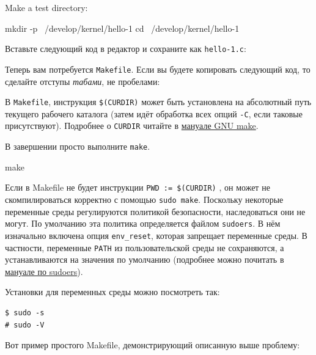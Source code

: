 \documentclass[10pt, oneside]{book}
\begin{document}
Make a test directory:
\begin{codebash}
mkdir -p ~/develop/kernel/hello-1
cd ~/develop/kernel/hello-1
\end{codebash}

Вставьте следующий код в редактор и сохраните как \verb|hello-1.c|:


Теперь вам потребуется \verb|Makefile|. Если вы будете копировать следующий код, то сделайте отступы \textit{табами}, не пробелами:


В \verb|Makefile|, инструкция \verb|$(CURDIR)| может быть установлена на абсолютный путь текущего рабочего каталога (затем идёт обработка всех опций \verb|-C|, если таковые присутствуют).
Подробнее о \verb|CURDIR| читайте в \href{https://www.gnu.org/software/make/manual/make.html}{мануале GNU make}.

В завершении просто выполните \verb|make|.

\begin{codebash}
make
\end{codebash}

Если в Makefile не будет инструкции \verb|PWD := $(CURDIR)| , он может не скомпилироваться корректно с помощью \verb|sudo make|.
Поскольку некоторые переменные среды регулируются политикой безопасности, наследоваться они не могут. По умолчанию эта политика
определяется файлом \verb|sudoers|.
В нём изначально включена опция \verb|env_reset|, которая запрещает переменные среды. В частности, переменные \verb|PATH| из пользовательской среды не сохраняются, а устанавливаются на значения по умолчанию (подробнее можно почитать в \href{https://www.sudo.ws/docs/man/sudoers.man/}{мануале по sudoers}).

Установки для переменных среды можно посмотреть так:

\begin{verbatim}
$ sudo -s
# sudo -V
\end{verbatim}

Вот пример простого Makefile, демонстрирующий описанную выше проблему:
\end{document}
